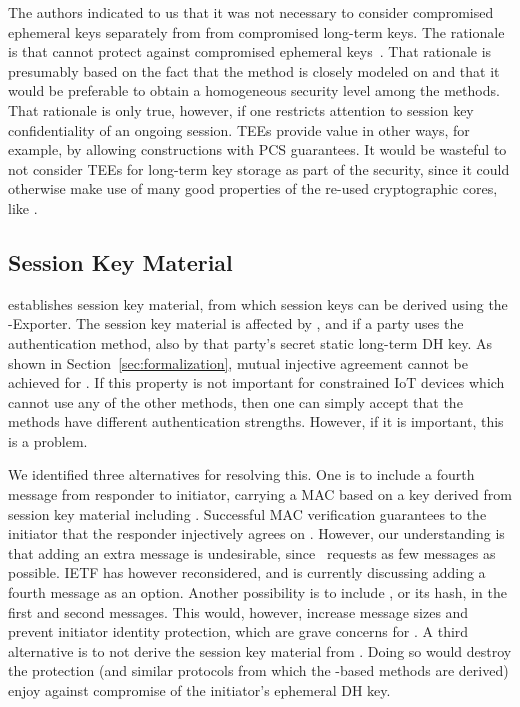 \documentclass[runningheads, envcountsame, hidelinks, a4paper, draft, x11names]{llncs}
\begin{document}
The \mEdhoc{} authors indicated to us that it was
not necessary to consider compromised ephemeral keys separately from
from compromised long-term keys.
%
The rationale is that \mSigma{} cannot protect against compromised ephemeral
keys~\cite{personalCommunication}.
%
That rationale is presumably based on the fact that the \mSigSig{} method is
closely modeled on \mSigmaI{} and that it would be preferable to obtain a
homogeneous security level among the \mEdhoc{}
methods.
%
That rationale is only true, however, if one restricts attention to session key
confidentiality of an ongoing session.
%
TEEs provide value in other ways, for example, by allowing constructions with
PCS guarantees.
%
It would be wasteful to not consider TEEs for long-term key storage as part of
the security, since it could otherwise make use of many good properties of the
re-used cryptographic cores, like \mOptls.
%
%

\subsection{Session Key Material}
\label{sec:sessionKeyMaterial}
\mEdhoc{} establishes session key material, from which session keys
can be derived using the \mEdhoc{}-Exporter.
%
The session key material is affected by \mGxy{}, and if a party uses the
\mStat{} authentication method, also by that party's secret static long-term DH key.
%
As shown in Section~\ref{sec:formalization}, mutual injective agreement cannot
be achieved for \mGiy{}.
%
If this property is not important for constrained IoT devices which cannot use
any of the other methods, then one can simply accept that the methods have
different authentication strengths.
%
However, if it is important, this is a problem.
%

We identified three alternatives for resolving this.
%
One is to include a fourth message from responder to initiator,
carrying a MAC based on a key derived from session key
material including \mGiy{}.
%
Successful MAC verification guarantees
to the initiator that the responder injectively agrees on \mGiy{}.
%
However, our understanding is that adding an extra message is
undesirable, since~\cite{our-analysis-selander-lake-edhoc-01} requests as few messages as
possible.
%
IETF has however reconsidered, and is currently discussing adding a fourth
message as an option.
%
Another possibility is to include \mGi{}, or its hash, in the first and
second messages.
%
This would, however, increase message sizes and prevent initiator identity
protection, which are grave concerns for \mEdhoc{}.
%
A third alternative is to not derive the session key material from \mGiy{}.
%
Doing so would destroy the protection \mOptls{} (and similar protocols from
which the \mStat{}-based methods are derived) enjoy against compromise
of the initiator's ephemeral DH key.
%
\end{document}
